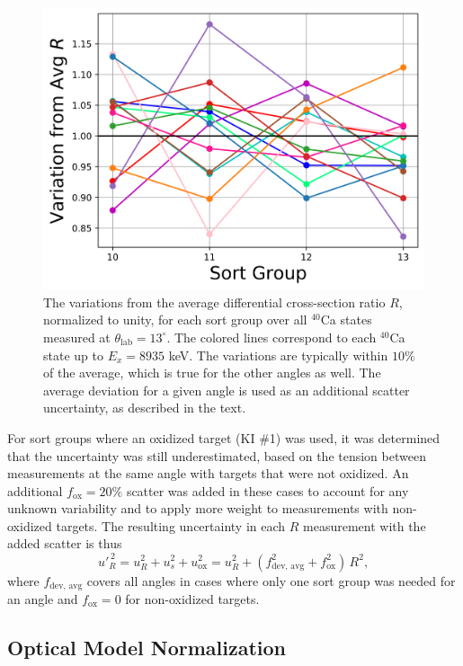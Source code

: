 \begin{figure}[t]
\centering
\includegraphics[width=6in]{Chapter-6/figs/variation_13deg.png}
\caption{\label{fig:variation}The variations from the average differential cross-section ratio $R$, normalized to unity, for each sort group over all $^{40}$Ca states measured at $\theta_{\mathrm{lab}} = 13^{\circ}$. The colored lines correspond to each $^{40}$Ca state up to $E_{x} = 8935$ keV. The variations are typically within $10\%$ of the average, which is true for the other angles as well. The average deviation for a given angle is used as an additional scatter uncertainty, as described in the text.}
\end{figure}

For sort groups where an oxidized target (KI $\#$1) was used, it was determined that the uncertainty was still underestimated, based on the tension between measurements at the same angle with targets that were not oxidized. An additional $f_{\mathrm{ox}} = 20\%$ scatter was added in these cases to account for any unknown variability and to apply more weight to measurements with non-oxidized targets. The resulting uncertainty in each $R$ measurement with the added scatter is thus
\begin{equation}
u'^{\, 2}_{R} = u^{2}_{R} + u^{2}_{s} + u^{2}_{\mathrm{ox}} = u^{2}_{R} + (f^{2}_{\mathrm{dev,\, avg}} + f^{2}_{\mathrm{ox}}) \, R^{2},
\end{equation}
where $f_{\mathrm{dev,\, avg}}$ covers all angles in cases where only one sort group was needed for an angle and $f_{\mathrm{ox}} = 0$ for non-oxidized targets. 

\subsection{Optical Model Normalization} \label{subsec:global_norm}

